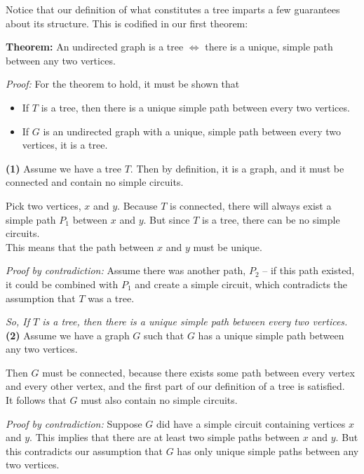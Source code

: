 \documentclass[a4paper,10pt]{report}
\begin{document}
Notice that our definition of what constitutes a tree imparts a few guarantees about its structure. This is codified in our first theorem:

\hrulefill

\noindent\textbf{Theorem: }An undirected graph is a tree $\iff$ there is a unique, simple path between any two vertices.

\textit{Proof:} For the theorem to hold, it must be shown that
\begin{itemize}
	\item If $T$ is a tree, then there is a unique simple path between every two vertices.
	\item If $G$ is an undirected graph with a unique, simple path between every two vertices, it is a tree.
\end{itemize}

\textbf{(1)} Assume we have a tree $T$.
Then by definition, it is a graph, and it must be connected and contain no simple circuits.

Pick two vertices, $x$ and $y$.
Because $T$ is connected, there will always exist a simple path $P_1$ between $x$ and $y$.
But since $T$ is a tree, there can be no simple circuits. \\

This means that the path between $x$ and $y$ must be unique.

\textit{Proof by contradiction:}
Assume there was another path, $P_2$ -- if this path existed, it could be combined with $P_1$ and create a simple circuit, which contradicts the assumption that $T$ was a tree.

\textit{So, If $T$ is a tree, then there is a unique simple path between every two vertices.} \\

\textbf{(2)} Assume we have a graph $G$ such that $G$ has a unique simple path between any two vertices.

Then $G$ must be connected, because there exists some path between every vertex and every other vertex, and the first part of our definition of a tree is satisfied. \\

It follows that $G$ must also contain no simple circuits.

\textit{Proof by contradiction:}
Suppose $G$ did have a simple circuit containing vertices $x$ and $y$. This implies that there are at least two simple paths between $x$ and $y$. But this contradicts our assumption that $G$ has only unique simple paths between any two vertices.
\end{document}

